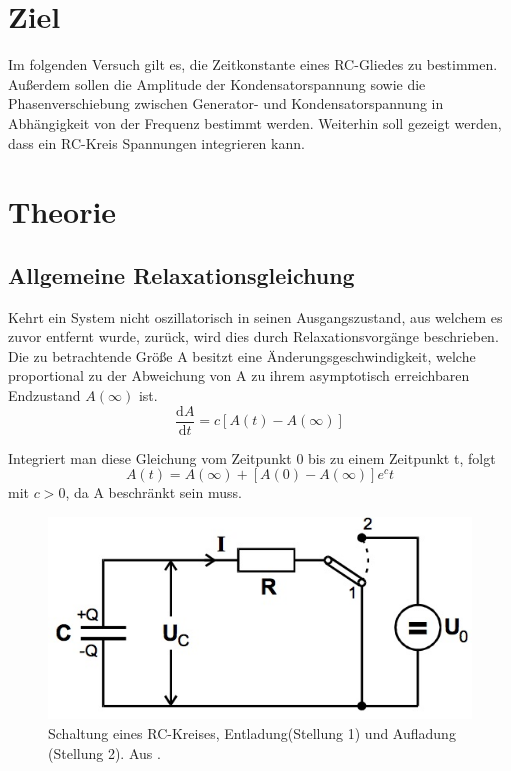 \section{Ziel}
\label{sec:Ziel}
Im folgenden Versuch gilt es, die Zeitkonstante eines RC-Gliedes zu bestimmen. Außerdem sollen die Amplitude der Kondensatorspannung sowie die Phasenverschiebung zwischen Generator- und Kondensatorspannung in Abhängigkeit von der Frequenz bestimmt werden. Weiterhin soll gezeigt werden, dass ein RC-Kreis Spannungen integrieren kann.

\section{Theorie}
\label{sec:Theorie}
\subsection{Allgemeine Relaxationsgleichung}
Kehrt ein System nicht oszillatorisch in seinen Ausgangszustand, aus welchem es zuvor entfernt wurde, zurück, wird dies durch Relaxationsvorgänge beschrieben. Die zu betrachtende Größe A besitzt eine Änderungsgeschwindigkeit, welche proportional zu der Abweichung von A zu ihrem asymptotisch erreichbaren Endzustand $A(\infty)$ ist.
\begin{equation}
\label{eqn:dgl}
  \frac{\mathrm{d}A}{\mathrm{d}t} = c[A(t)-A(\infty)]
\end{equation}

Integriert man diese Gleichung vom Zeitpunkt 0 bis zu einem Zeitpunkt t, folgt
\begin{equation}
  A(t) = A(\infty) + [A(0) - A(\infty)]e^ct
\end{equation}
mit $c > 0$, da A beschränkt sein muss.

\begin{figure}
  \centering
  \includegraphics[scale=0.5]{content/RC-Kreis.jpg}
  \caption{Schaltung eines RC-Kreises, Entladung(Stellung 1) und Aufladung (Stellung 2). Aus \cite{anleitung353}.}
  \label{fig:rc-kreis}
\end{figure}

